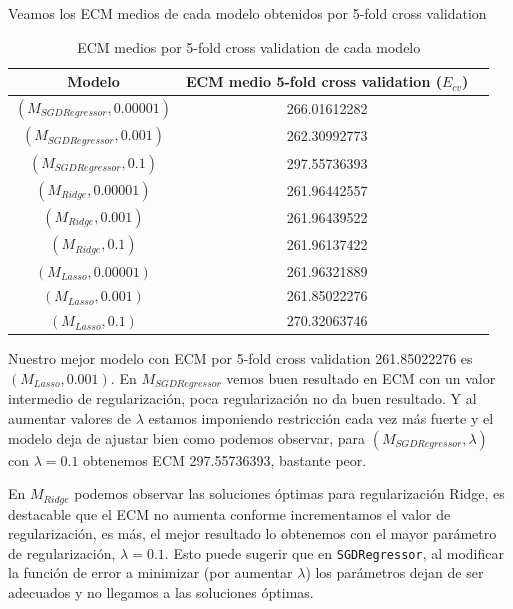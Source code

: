 \documentclass[11pt,a4paper]{article}
\theoremstyle{definition}
\begin{document}
	Veamos los ECM medios de cada modelo obtenidos por 5-fold cross validation
	\begin{table}[H]
	\begin{center}
	\begin{tabular}{|c|c|c|}
	\hline
	 Modelo & ECM medio 5-fold cross validation ($E_{cv}$) \\
	\hline \hline
	$(M_{SGDRegressor},0.00001)$ & 266.01612282 \\ \hline
	$(M_{SGDRegressor},0.001)$ & 262.30992773 \\ \hline
	$(M_{SGDRegressor},0.1)$ & 297.55736393 \\ \hline
	$(M_{Ridge},0.00001)$ & 261.96442557 \\ \hline
	$(M_{Ridge},0.001)$ & 261.96439522 \\ \hline
	$(M_{Ridge},0.1)$ & 261.96137422 \\ \hline
	$(M_{Lasso},0.00001)$ & 261.96321889 \\ \hline
	$(M_{Lasso},0.001)$ & 261.85022276\\ \hline
	$(M_{Lasso},0.1)$ & 270.32063746 \\ \hline
	\end{tabular}
	\caption{ECM medios por 5-fold cross validation de cada modelo}
	\label{tabla:sencilla}
	\end{center}
	\end{table}
	Nuestro mejor modelo con ECM por 5-fold cross validation 261.85022276 es $(M_{Lasso},0.001)$. En $M_{SGDRegressor}$ vemos buen resultado en ECM con un valor intermedio de regularización, poca regularización no da buen resultado. Y al aumentar valores de $\lambda$ estamos imponiendo restricción cada vez más fuerte y el modelo deja de ajustar bien como podemos observar, para $(M_{SGDRegressor},\lambda)$ con $\lambda=0.1$ obtenemos ECM 297.55736393, bastante peor.
	
	 En $M_{Ridge}$ podemos observar las soluciones óptimas para regularización Ridge, es destacable que el ECM no aumenta conforme incrementamos el valor de regularización, es más, el mejor resultado lo obtenemos con el mayor parámetro de regularización, $\lambda = 0.1$. Esto puede sugerir que en \texttt{SGDRegressor}, al modificar la función de error a minimizar (por aumentar $\lambda$) los parámetros dejan de ser adecuados y no llegamos a las soluciones óptimas.
	
\end{document}
